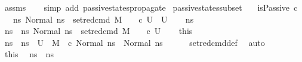\begin{isabellebody}
\ assms\isanewline
\ \ \isamarkupfalse%
\ {\isacharparenleft}{\kern0pt}simp\ add{\isacharcolon}{\kern0pt}\ passive{\isacharunderscore}{\kern0pt}states{\isacharunderscore}{\kern0pt}propagate{\isacharparenright}{\kern0pt}%
\endisatagproof
{\isafoldproof}%
%
\isadelimproof
\isanewline
%
\endisadelimproof
\isanewline
{}\isamarkupfalse%
\ passive{\isacharunderscore}{\kern0pt}states{\isacharunderscore}{\kern0pt}subset{\isacharcolon}{\kern0pt}\isanewline
\ \ \ {\isachardoublequoteopen}isPassive\ c{\isachardoublequoteclose}\isanewline
\ \ \ {\isachardoublequoteopen}{\isacharbraceleft}{\kern0pt}ns{\isacharprime}{\kern0pt}{\isachardot}{\kern0pt}\ Normal\ ns{\isacharprime}{\kern0pt}\ {\isasymin}\ {\isacharparenleft}{\kern0pt}set{\isacharunderscore}{\kern0pt}red{\isacharunderscore}{\kern0pt}cmd\ M\ {\isasymLambda}\ {\isasymGamma}\ {\isasymOmega}\ c\ U{\isacharparenright}{\kern0pt}{\isacharbraceright}{\kern0pt}\ {\isasymsubseteq}\ U{\isachardoublequoteclose}\isanewline
%
\isadelimproof
%
\endisadelimproof
%
\isatagproof
{}\isamarkupfalse%
\isanewline
\ \ \isamarkupfalse%
\ ns\isanewline
\ \ \isamarkupfalse%
\ {\isachardoublequoteopen}ns\ {\isasymin}\ {\isacharbraceleft}{\kern0pt}ns{\isacharprime}{\kern0pt}{\isachardot}{\kern0pt}\ Normal\ ns{\isacharprime}{\kern0pt}\ {\isasymin}\ {\isacharparenleft}{\kern0pt}set{\isacharunderscore}{\kern0pt}red{\isacharunderscore}{\kern0pt}cmd\ M\ {\isasymLambda}\ {\isasymGamma}\ {\isasymOmega}\ c\ U{\isacharparenright}{\kern0pt}{\isacharbraceright}{\kern0pt}{\isachardoublequoteclose}\isanewline
\ \ \isamarkupfalse%
\ this\ \isamarkupfalse%
\ ns{}\ \ {\isachardoublequoteopen}ns{}\ {\isasymin}\ U{\isachardoublequoteclose}\ \ {\isachardoublequoteopen}M{\isacharcomma}{\kern0pt}{\isasymLambda}{\isacharcomma}{\kern0pt}{\isasymGamma}{\isacharcomma}{\kern0pt}{\isasymOmega}\ {\isasymturnstile}\ {\isasymlangle}c{\isacharcomma}{\kern0pt}\ Normal\ ns{}{\isasymrangle}\ {\isasymrightarrow}\ Normal\ ns{\isachardoublequoteclose}\isanewline
\ \ \ \ \isamarkupfalse%
\ set{\isacharunderscore}{\kern0pt}red{\isacharunderscore}{\kern0pt}cmd{\isacharunderscore}{\kern0pt}def\ \isamarkupfalse%
\ auto\ \isanewline
\ \ \isamarkupfalse%
\ \isamarkupfalse%
\ this\ \isamarkupfalse%
\ {\isachardoublequoteopen}ns{}\ {\isacharequal}{\kern0pt}\ ns{\isachardoublequoteclose}\ \isamarkupfalse%

\end{isabellebody}

